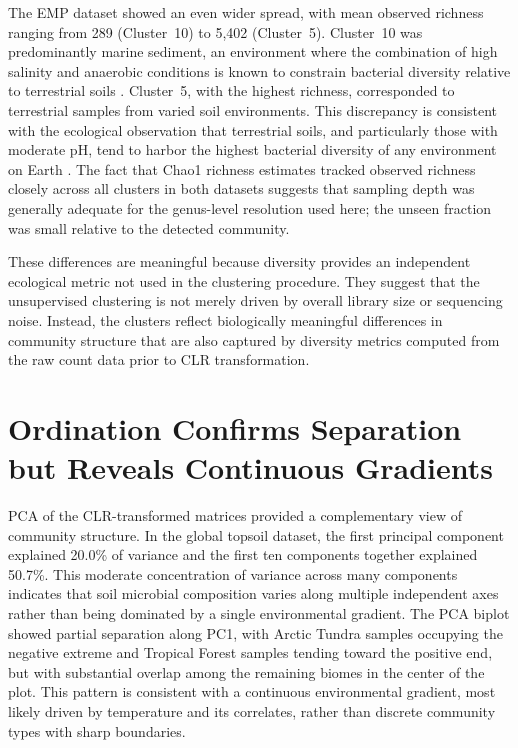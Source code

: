 \documentclass[12pt, oneside]{report}
\begin{document}
The EMP dataset showed an even wider spread, with mean observed richness ranging from 289
(Cluster~10) to 5,402 (Cluster~5). Cluster~10 was predominantly marine sediment, an
environment where the combination of high salinity and anaerobic conditions is known to
constrain bacterial diversity relative to terrestrial soils
\cite{thompson2017}. Cluster~5, with the highest richness,
corresponded to terrestrial samples from varied soil environments. This discrepancy is
consistent with the ecological observation that terrestrial soils, and particularly
those with moderate pH, tend to harbor the highest bacterial diversity of any environment
on Earth \cite{fierer2006}. The fact that Chao1 richness estimates
tracked observed richness closely across all clusters in both datasets suggests that
sampling depth was generally adequate for the genus-level resolution used here; the unseen
fraction was small relative to the detected community.

These differences are meaningful because diversity provides an independent ecological metric not used in the clustering procedure. They suggest that the unsupervised clustering is not merely driven by overall library size or sequencing noise. Instead, the clusters reflect biologically meaningful differences in community structure that are also captured by diversity metrics computed from the raw count data prior to CLR transformation.

\section{Ordination Confirms Separation but Reveals Continuous Gradients}
\label{disc:ordination}

PCA of the CLR-transformed matrices provided a complementary view of community structure.
In the global topsoil dataset, the first principal component explained 20.0\% of variance
and the first ten components together explained 50.7\%. This moderate concentration of
variance across many components indicates that soil microbial composition varies along
multiple independent axes rather than being dominated by a single environmental gradient.
The PCA biplot showed partial separation along PC1, with Arctic Tundra samples occupying the negative extreme and Tropical Forest samples tending toward the positive end, but with substantial overlap among the remaining biomes in the center of the plot. This pattern is consistent with a continuous environmental gradient, most likely driven by temperature and its correlates, rather than discrete community types with sharp boundaries.
\end{document}
